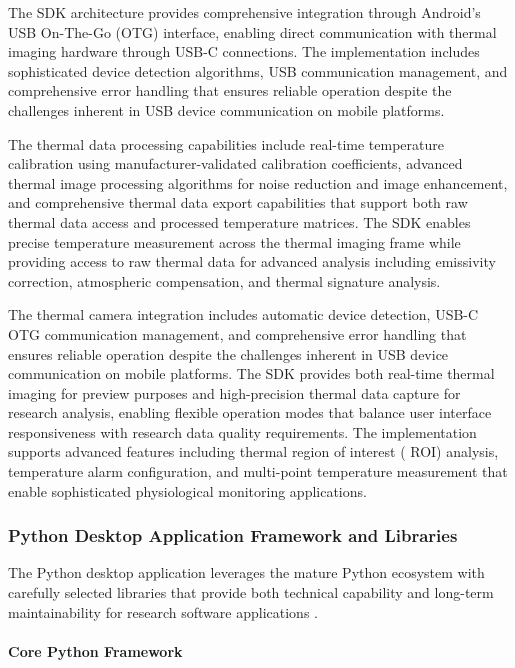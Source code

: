 \documentclass[11pt,a4paper]{report}
\begin{document}
The SDK architecture provides comprehensive integration through Android's USB On-The-Go (OTG) interface, enabling direct
communication with thermal imaging hardware through USB-C connections. The implementation includes sophisticated device
detection algorithms, USB communication management, and comprehensive error handling that ensures reliable operation
despite the challenges inherent in USB device communication on mobile platforms.

The thermal data processing capabilities include real-time temperature calibration using manufacturer-validated
calibration coefficients, advanced thermal image processing algorithms for noise reduction and image enhancement, and
comprehensive thermal data export capabilities that support both raw thermal data access and processed temperature
matrices. The SDK enables precise temperature measurement across the thermal imaging frame while providing access to raw
thermal data for advanced analysis including emissivity correction, atmospheric compensation, and thermal signature
analysis.

The thermal camera integration includes automatic device detection, USB-C OTG communication management, and
comprehensive error handling that ensures reliable operation despite the challenges inherent in USB device communication
on mobile platforms. The SDK provides both real-time thermal imaging for preview purposes and high-precision thermal
data capture for research analysis, enabling flexible operation modes that balance user interface responsiveness with
research data quality requirements. The implementation supports advanced features including thermal region of interest (
ROI) analysis, temperature alarm configuration, and multi-point temperature measurement that enable sophisticated
physiological monitoring applications.

\subsubsection{Python Desktop Application Framework and Libraries}

The Python desktop application leverages the mature Python ecosystem with carefully selected libraries that provide both
technical capability and long-term maintainability for research software applications .

\paragraph{Core Python Framework}
\end{document}
